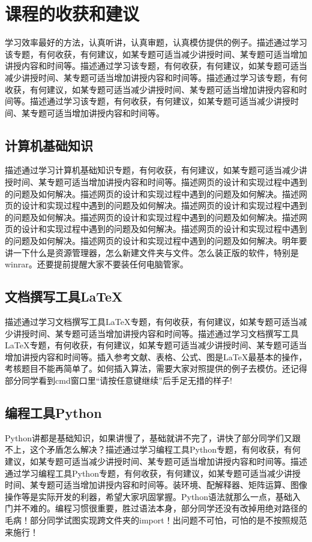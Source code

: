 \documentclass[supercite]{Experimental_Report}
\theoremstyle{definition}
\begin{document}
\newpage

\section{课程的收获和建议}

学习效率最好的方法，认真听讲，认真审题，认真模仿提供的例子。描述通过学习该专题，有何收获，有何建议，如某专题可适当减少讲授时间、某专题可适当增加讲授内容和时间等。描述通过学习该专题，有何收获，有何建议，如某专题可适当减少讲授时间、某专题可适当增加讲授内容和时间等。描述通过学习该专题，有何收获，有何建议，如某专题可适当减少讲授时间、某专题可适当增加讲授内容和时间等。描述通过学习该专题，有何收获，有何建议，如某专题可适当减少讲授时间、某专题可适当增加讲授内容和时间等。

\subsection{计算机基础知识}

描述通过学习计算机基础知识专题，有何收获，有何建议，如某专题可适当减少讲授时间、某专题可适当增加讲授内容和时间等。描述网页的设计和实现过程中遇到的问题及如何解决。描述网页的设计和实现过程中遇到的问题及如何解决。描述网页的设计和实现过程中遇到的问题及如何解决。描述网页的设计和实现过程中遇到的问题及如何解决。描述网页的设计和实现过程中遇到的问题及如何解决。描述网页的设计和实现过程中遇到的问题及如何解决。描述网页的设计和实现过程中遇到的问题及如何解决。描述网页的设计和实现过程中遇到的问题及如何解决。明年要讲一下什么是资源管理器，怎么新建文件夹与文件。怎么装正版的软件，特别是winrar。还要提前提醒大家不要装任何电脑管家。

\subsection{文档撰写工具LaTeX}

描述通过学习文档撰写工具LaTeX专题，有何收获，有何建议，如某专题可适当减少讲授时间、某专题可适当增加讲授内容和时间等。描述通过学习文档撰写工具LaTeX专题，有何收获，有何建议，如某专题可适当减少讲授时间、某专题可适当增加讲授内容和时间等。插入参考文献、表格、公式、图是LaTeX最基本的操作，考核题目不能再简单了。如何插入算法，需要大家对照提供的例子去模仿。还记得部分同学看到cmd窗口里``请按任意键继续''后手足无措的样子!

\subsection{编程工具Python}

Python讲都是基础知识，如果讲慢了，基础就讲不完了，讲快了部分同学们又跟不上，这个矛盾怎么解决？描述通过学习编程工具Python专题，有何收获，有何建议，如某专题可适当减少讲授时间、某专题可适当增加讲授内容和时间等。描述通过学习编程工具Python专题，有何收获，有何建议，如某专题可适当减少讲授时间、某专题可适当增加讲授内容和时间等。装环境、配解释器、矩阵运算、图像操作等是实际开发的利器，希望大家巩固掌握。Python语法就那么一点，基础入门并不难的。编程习惯很重要，胜过语法本身，部分同学还没有改掉用绝对路径的毛病！部分同学试图实现跨文件夹的import！出问题不可怕，可怕的是不按照规范来施行！
\end{document}
